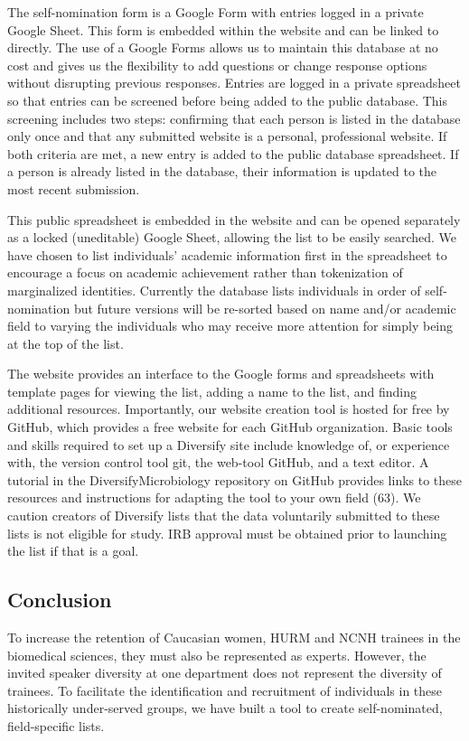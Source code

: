 \documentclass[10pt,]{article}
\begin{document}
The self-nomination form is a Google Form with entries logged in a
private Google Sheet. This form is embedded within the website and can
be linked to directly. The use of a Google Forms allows us to maintain
this database at no cost and gives us the flexibility to add questions
or change response options without disrupting previous responses.
Entries are logged in a private spreadsheet so that entries can be
screened before being added to the public database. This screening
includes two steps: confirming that each person is listed in the
database only once and that any submitted website is a personal,
professional website. If both criteria are met, a new entry is added to
the public database spreadsheet. If a person is already listed in the
database, their information is updated to the most recent submission.

This public spreadsheet is embedded in the website and can be opened
separately as a locked (uneditable) Google Sheet, allowing the list to
be easily searched. We have chosen to list individuals' academic
information first in the spreadsheet to encourage a focus on academic
achievement rather than tokenization of marginalized identities.
Currently the database lists individuals in order of self-nomination but
future versions will be re-sorted based on name and/or academic field to
varying the individuals who may receive more attention for simply being
at the top of the list.

The website provides an interface to the Google forms and spreadsheets
with template pages for viewing the list, adding a name to the list, and
finding additional resources. Importantly, our website creation tool is
hosted for free by GitHub, which provides a free website for each GitHub
organization. Basic tools and skills required to set up a Diversify site
include knowledge of, or experience with, the version control tool git,
the web-tool GitHub, and a text editor. A tutorial in the
DiversifyMicrobiology repository on GitHub provides links to these
resources and instructions for adapting the tool to your own field (63).
We caution creators of Diversify lists that the data voluntarily
submitted to these lists is not eligible for study. IRB approval must be
obtained prior to launching the list if that is a goal.

\subsection{Conclusion}\label{conclusion}

To increase the retention of Caucasian women, HURM and NCNH trainees in
the biomedical sciences, they must also be represented as experts.
However, the invited speaker diversity at one department does not
represent the diversity of trainees. To facilitate the identification
and recruitment of individuals in these historically under-served
groups, we have built a tool to create self-nominated, field-specific
lists.
\end{document}

